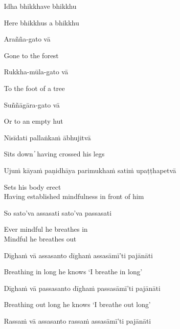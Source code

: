 Idha bhikkhave bhikkhu

\begin{cprenglish}
  Here bhikkhus a bhikkhu
\end{cprenglish}

Arañña-gato vā

\begin{cprenglish}
  Gone to the forest
\end{cprenglish}

Rukkha-mūla-gato vā

\begin{cprenglish}
  To the foot of a tree
\end{cprenglish}

Suññāgāra-gato vā

\begin{cprenglish}
  Or to an empty hut
\end{cprenglish}

Nisīdati pallaṅkaṁ ābhujitvā

\begin{cprenglish}
  Sits down  ̓  having crossed his legs
\end{cprenglish}

Ujuṁ kāyaṁ paṇidhāya parimukhaṁ satiṁ upaṭṭhapetvā

\begin{cprenglish}
  Sets his body erect\\
  Having established mindfulness in front of him
\end{cprenglish}

So sato’va assasati sato’va passasati

\begin{cprenglish}
  Ever mindful he breathes in\\
  Mindful he breathes out
\end{cprenglish}

Dīghaṁ vā assasanto dīghaṁ assasāmī’ti pajānāti

\begin{cprenglish}
  Breathing in long he knows ‘I breathe in long’
\end{cprenglish}

Dīghaṁ vā passasanto dīghaṁ passasāmī’ti pajānāti

\begin{cprenglish}
  Breathing out long he knows ‘I breathe out long’
\end{cprenglish}

Rassaṁ vā assasanto rassaṁ assasāmī’ti pajānāti

